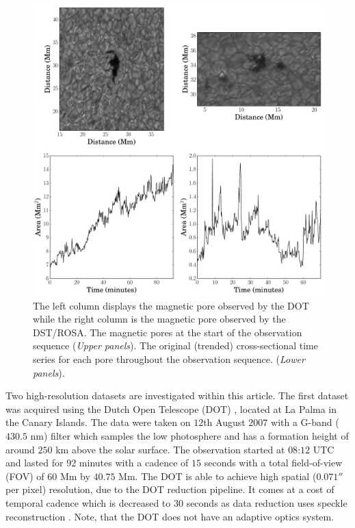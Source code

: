     \begin{figure}
        \centering
        \includegraphics[width=\textwidth]{overview.pdf}
        \caption{
		         The left column displays the magnetic pore observed by the DOT while the right column is the magnetic pore observed by the DST/ROSA. 	
	        	 The magnetic pores at the start of the observation sequence (\textit{Upper panels}).
	             The original (trended) cross-sectional time series for each pore throughout the observation sequence. (\textit{Lower panels}).}
        \label{overview}
    \end{figure}
    
    Two high-resolution datasets are investigated within this article.
    The first dataset was acquired using the Dutch Open Telescope (DOT) \citep{rutten}, located at La Palma in the Canary Islands. 
    The data were taken on $12$th August $2007$ with a G-band ($430.5$ nm) filter which samples the low photosphere and has a formation height of around $250$ km above the solar surface.
    The observation started at $08$:$12$ UTC and lasted for $92$ minutes with a cadence of $15$ seconds with a total field-of-view (FOV) of $60$ Mm by $40.75$ Mm.
    The DOT is able to achieve high spatial ($0.071''$ per pixel) resolution, due to the DOT reduction pipeline.
    It comes at a cost of temporal cadence which is decreased to $30$ seconds as data reduction uses speckle reconstruction \cite[]{1992A&A...261..321K}.
    Note, that the DOT does not have an adaptive optics system.
    
